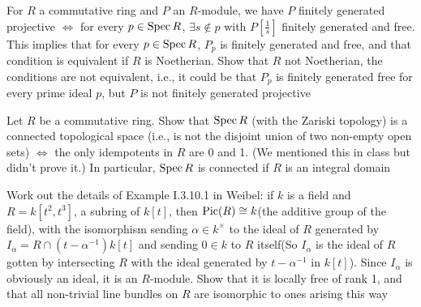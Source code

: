 \documentclass[main]{subfiles}
\begin{document}
\begin{exercise}
For $R$ a commutative ring and $P$ an $R$-module, we have $P$ finitely generated projective $\iff$ for every $p\in\operatorname{Spec} R$, $\exists s\notin p$ with $P[\frac{1}{s}]$ finitely generated and free. This implies that for every $p \in \operatorname{Spec} R$, $P_p$ is finitely generated and free, and that condition is equivalent if $R$ is Noetherian. Show that $R$ not Noetherian, the conditions are not equivalent, i.e., it could be that $P_p$ is finitely generated free for every prime ideal $p$, but $P$ is not finitely generated projective
\end{exercise}

\begin{solution}

\end{solution}

\begin{exercise}
Let $R$ be a commutative ring. Show that $\operatorname{Spec} R$ (with the Zariski topology) is a connected topological space (i.e., is not the disjoint union of two non-empty open sets) $\iff$ the only idempotents in $R$ are 0 and 1. (We mentioned this in class but didn’t prove it.) In particular, $\operatorname{Spec} R$ is connected if $R$ is an integral domain
\end{exercise}

\begin{solution}

\end{solution}

\begin{exercise}
Work out the details of Example I.3.10.1 in Weibel: if $k$ is a field and $R = k[t^2,t^3]$, a subring of $k[t]$, then $\operatorname{Pic}(R)\cong k$(the additive group of the field), with the isomorphism sending $\alpha\in k^\times$ to the ideal of $R$ generated by $I_\alpha = R \cap (t-\alpha^{-1})k[t]$ and sending $0\in k$ to $R$ itself(So $I_\alpha$ is the ideal of $R$ gotten by intersecting $R$ with the ideal generated by $t-\alpha^{-1}$ in $k[t]$). Since $I_\alpha$ is obviously an ideal, it is an $R$-module. Show that it is locally free of rank 1, and that all non-trivial line bundles on $R$ are isomorphic to ones arising this way
\end{exercise}

\begin{solution}

\end{solution}
\end{document}

